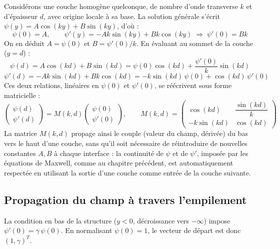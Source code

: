\documentclass[a4paper,11pt]{report}
\begin{document}
Considérons une couche homogène quelconque, de nombre d'onde transverse $k$ et d'épaisseur $d$, avec origine locale à sa base. La solution générale s'écrit $\psi(y)=A\cos(ky)+B\sin(ky)$, d'où :
\begin{equation}
\psi(0)=A, \qquad \psi'(y)=-Ak\sin(ky)+Bk\cos(ky) \;\Rightarrow\; \psi'(0)=Bk
\end{equation}
On en déduit $A=\psi(0)$ et $B=\psi'(0)/k$. En évaluant au sommet de la couche ($y=d$) :
\begin{equation}
\psi(d)=A\cos(kd)+B\sin(kd) = \psi(0)\cos(kd)+\frac{\psi'(0)}{k}\sin(kd)
\end{equation}
\begin{equation}
\psi'(d)=-Ak\sin(kd)+Bk\cos(kd) = -k\sin(kd)\,\psi(0)+\cos(kd)\,\psi'(0)
\end{equation}
Ces deux relations, linéaires en $\psi(0)$ et $\psi'(0)$, se réécrivent sous forme matricielle :
\begin{equation}
\begin{pmatrix}\psi(d)\\\psi'(d)\end{pmatrix} = M(k,d)\begin{pmatrix}\psi(0)\\\psi'(0)\end{pmatrix}, \qquad
M(k,d)=\begin{pmatrix}\cos(kd) & \dfrac{\sin(kd)}{k} \\[4pt] -k\sin(kd) & \cos(kd)\end{pmatrix}
\label{eq:matrice_transfert}
\end{equation}
La matrice $M(k,d)$ propage ainsi le couple (valeur du champ, dérivée) du bas vers le haut d'une couche, sans qu'il soit nécessaire de réintroduire de nouvelles constantes $A,B$ à chaque interface : la continuité de $\psi$ et de $\psi'$, imposée par les équations de Maxwell, comme au chapitre précédent, est automatiquement respectée en utilisant la sortie d'une couche comme entrée de la couche suivante.

\subsection*{Propagation du champ à travers l'empilement}

La condition en bas de la structure ($y<0$, décroissance vers $-\infty$) impose $\psi'(0)=\gamma\,\psi(0)$. En normalisant $\psi(0)=1$, le vecteur de départ est donc $(1,\gamma)^T$.
\end{document}
